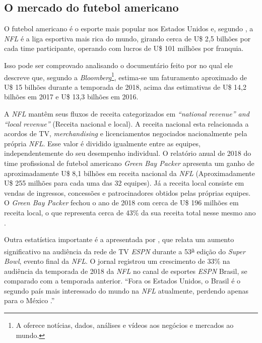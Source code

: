 \subsection{O mercado do futebol americano}
\label{mercado-do-futebol-americano}

O futebol americano é o esporte mais popular nos Estados Unidos e, segundo , a \textit{NFL} é a liga esportiva mais rica do mundo, girando cerca de U\$ 2,5 bilhões por cada time participante, operando com lucros de U\$ 101 milhões por franquia.

Isso pode ser comprovado analisando o documentário feito por  no qual ele descreve que, segundo a \textit{Bloomberg}\footnote{A  oferece notícias, dados, análises e vídeos aos negócios e mercados ao mundo.\label{Bloomberg}}, estima-se um faturamento aproximado de U\$ 15 bilhões durante a temporada de 2018, acima das estimativas de U\$ 14,2 bilhões em 2017 e U\$ 13,3 bilhões em 2016.


A \textit{NFL} mantêm seus fluxos de receita categorizados em \textit{“national revenue” and “local revenue”} (Receita nacional e local). A receita nacional esta relacionada a acordos de TV, \textit{merchandising} e licenciamentos negociados nacionalmente pela própria \textit{NFL}.  Esse valor é dividido igualmente entre as equipes, independentemente do seu desempenho individual. O relatório anual de 2018 do time profissional de futebol americano \textit{Green Bay Packer} apresenta um ganho de aproximadamente U\$ 8,1 bilhões em receita nacional da \textit{NFL} (Aproximadamente  U\$ 255 milhões para cada uma das 32 equipes). Já a receita local consiste em vendas de ingressos, concessões e patrocinadores obtidos pelas próprias equipes. O \textit{Green Bay Packer} fechou o ano de 2018 com cerca de U\$ 196 milhões em receita local, o que representa cerca de 43\% da sua receita total nesse mesmo ano \cite{INVESTOPEDIA2019}.

Outra estatística importante é a apresentada por , que relata um aumento significativo na audiência da rede de TV \textit{ESPN} durante a 53\textsuperscript{\underline{a}} edição do \textit{Super Bowl}, evento final da \textit{NFL}. O jornal  registrou um crescimento de 33\% na audiência da temporada de 2018 da \textit{NFL} no canal de esportes \textit{ESPN} Brasil, se comparado com a temporada anterior. “Fora os Estados Unidos, o Brasil é o segundo país mais interessado do mundo na \textit{NFL} atualmente, perdendo apenas para o México \cite{FOLHASP2019}.”